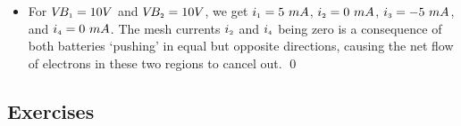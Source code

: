 \documentclass{ximera}
\begin{document}
\begin{ex}
\begin{itemize}
\item  For $V\!B_{\mbox{\tiny$1$}} = 10 V$ and $V\!B_{\mbox{\tiny$2$}} = 10 V$, we get $i_{\mbox{\tiny$1$}} = 5 \, \, mA$, $i_{\mbox{\tiny$2$}} = 0 \, \, mA$, $i_{\mbox{\tiny$3$}} = -5 \, \, mA$, and $i_{\mbox{\tiny$4$}} = 0 \, \, mA$.  The mesh currents $i_{\mbox{\tiny$2$}}$ and $i_{\mbox{\tiny$4$}}$ being zero is a consequence of both batteries `pushing' in equal but opposite directions, causing the net flow of electrons in these two regions to cancel out. \qed

\end{itemize}

\end{ex}

\subsection{Exercises}



\closegraphsfile
\end{document}
